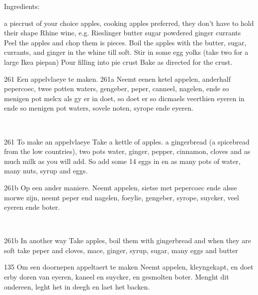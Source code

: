\documentclass[a4paper]{article}
\begin{document}
Ingredients:

a piecrust of your choice
apples, cooking apples preferred, they don’t have to hold their shape
Rhine wine, e.g. Rieslinger
butter
sugar
powdered ginger
currants
Peel the apples and chop them is pieces. Boil the apples with the butter, sugar, currants, and ginger in the whine till soft.
Stir in some egg yolks (take two for a large Ikea piepan)
Pour filling into pie crust
Bake as directed for the crust.

\medskip
\begin{minipage}{.45\textwidth}
261 Een appelvlaeye te maken.
261a Neemt eenen ketel appelen, anderhalf pepercoec, twee potten waters, gengeber, peper, canneel, nagelen, ende so menigen pot melcx als gy er in doet, so doet er so dicmaels veerthien eyeren in ende so menigen pot waters, sovele noten, syrope ende eyeren. \cite{cb}

\end{minipage}
\begin{minipage}{0.05\textwidth}
\ \ \ 
\end{minipage}
\begin{minipage}{.45\textwidth}
261 To make an appelvlaeye
Take a kettle of apples. a gingerbread (a spicebread from the low countries), two pots water, ginger, pepper, cinnamon, cloves and as much milk as you will add. So add some 14 eggs in en as many pots of water, many nuts, syrup and eggs.
\end{minipage}

\medskip
\begin{minipage}{.45\textwidth}
261b Op een ander maniere. 
Neemt appelen, sietse met pepercoec ende alsse morwe zijn, neemt peper end nagelen, foeylie, gengeber, syrope, suycker, veel eyeren ende boter.	\cite{cb}
\end{minipage}
\begin{minipage}{0.05\textwidth}
\ \ \ 
\end{minipage}
\begin{minipage}{.45\textwidth}
261b In another way
Take apples, boil them with gingerbread and when they are soft take peper and cloves, mace, ginger, syrup, sugar, many eggs and butter
\end{minipage}


\begin{minipage}{.45\textwidth}
135 Om een doornepen appeltaert te maken
Neemt appelen, kleyngekapt, en doet erby doren van eyeren, kaneel en suycker, en gesmolten boter. Menght dit ondereen, leght het in deegh en laet het backen.\cite{vk}
\end{minipage}
\begin{minipage}{0.05\textwidth}
\ \ \ 
\end{minipage}
\begin{minipage}{.45\textwidth}
\end{minipage}
\end{document}
